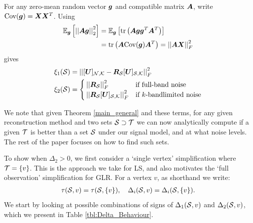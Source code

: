 {For any zero-mean random vector $\bm{g}$ and compatible matrix $\bm{A}$, write $\text{Cov}(\bm{g}) = \bm{X}\bm{X}^{T}$. Using 
\begin{align}
    \expect[\vect{g}]{\sqnormvec{\matr{A}\vect{g}}} &= \expect[\vect{g}]{\trace{\matr{A}\vect{g}\vect{g}^{T}\matr{A}^{T}}} \\
    &= \trace{\matr{A}\text{Cov}(\vect{g})\matr{A}^{T}} = \sqfrob{\matr{A}\matr{X}}
\end{align} gives
\begin{align}
    \xi_{1}(\set{S}) &= \sqfrob{\matrsubU{N} - \matr{R}_{\set{S}}\matrsubU{S}} \label{eq:xi_1_def} \\
    \xi_{2}(\set{S}) &= \begin{cases}
        \sqfrob{\matr{R}_{\set{S}}} &\text{if full-band noise} \label{eq:xi_2_def} \\
\sqfrob{\matr{R}_{\set{S}}\matrsubU{S}} &\text{if }k\textrm{-bandlimited noise} 
    \end{cases}
\end{align}

We note that given Theorem \ref{main_general} and these terms, for any given reconstruction method and two sets $\mathcal{S} \supset \mathcal{T}$ we can now analytically compute if a given $\mathcal{T}$ is better than a set $\mathcal{S}$ under our signal model, and at what noise levels. The rest of the paper focuses on how to find such sets.
}

To show when $\Delta_{2} > 0$, we first consider a `single vertex' simplification where $\mathcal{T} = \{v\}$. This is the approach we take for LS, and also motivates the `full observation' simplification for GLR. For a vertex $v$, as shorthand we write:
\begin{align}
    \tau(\mathcal{S},v) = \tau(\mathcal{S},\{v\})   
    , \quad \Delta_{i}(\mathcal{S},v) = \Delta_{i}(\mathcal{S},\{v\}). 
\end{align}
We start by looking at possible combinations of signs of $\Delta_{1}(\mathcal{S},v)$ and $\Delta_{2}(\mathcal{S},v)$, which we present in Table \ref{tbl:Delta_Behaviour}.

